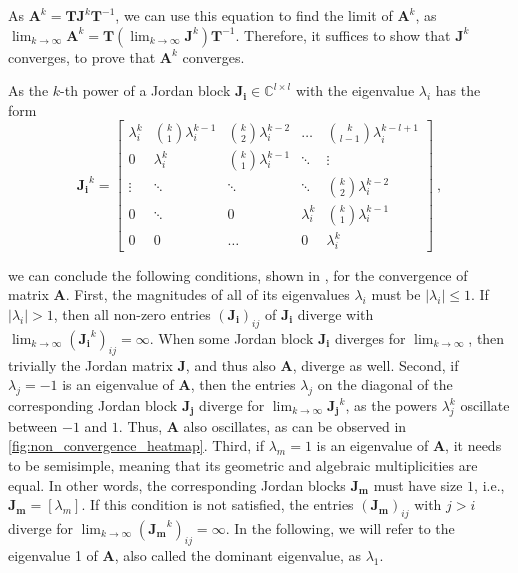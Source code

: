 \documentclass[journal,compsoc,10pt]{IEEEtran}
\newcommand{\CC}{\mathbb{C}}
\renewcommand{\vec}[1]{\bm{#1}}        %
\newcommand{\mat}[1]{\bm{#1}}          %
\begin{document}
As $\mat A^k = \mat T \mat J^k \mat T^{-1}$, %
we can use this equation to find the limit of $\mat A^k$, as $\lim_{k\rightarrow\infty}\mat A^k = \mat T (\lim_{k\rightarrow\infty} \mat J^k) \mat T^{-1}$. Therefore, it suffices to show that $\mat J^k$ converges, to prove that $\mat A^k$ converges.

As the $k$-th power of a Jordan block $\mat{J_i} \in \CC^{l\times l}$ with the eigenvalue $\lambda_i$ has the form 
\[\mat{J_i}^k = \begin{bmatrix}
\lambda_i^k & \binom{k}{1}\lambda_i^{k-1} & \binom{k}{2}\lambda_i^{k-2} & \dots & \binom{k}{l-1}\lambda_i^{k-l+1}\\
0 & \lambda_i^k & \binom{k}{1}\lambda_i^{k-1} & \ddots & \vdots\\
\vdots & \ddots & \ddots & \ddots & \binom{k}{2}\lambda_i^{k-2}\\
0 & \ddots & 0 & \lambda_i^k & \binom{k}{1}\lambda_i^{k-1}\\
0 & 0 & \dots & 0 & \lambda_i^k
\end{bmatrix}\ , \] %

we can conclude the following conditions, shown in \cite{Bullo_lecture}, for the convergence of matrix $\mat A$. First, the magnitudes of all of its eigenvalues $\lambda_i$ must be $|\lambda_i| \leq 1$. If $|\lambda_i| > 1$, then all non-zero entries $(\mat{J_i})_{ij}$ of $\mat{J_i}$ diverge with $\lim_{k\rightarrow\infty}(\mat{J_i}^k)_{ij} = \infty$. When some Jordan block $\mat{J_i}$ diverges for $\lim_{k\rightarrow\infty}$, then trivially the Jordan matrix $\mat J$, and thus also $\mat A$, diverge as well.
Second, if $\lambda_j = -1$ is an eigenvalue of $\mat A$, then the entries $\lambda_j$ on the diagonal of the corresponding Jordan block $\mat{J_j}$ diverge for $\lim_{k\rightarrow\infty}\mat{J_j}^k$, as the powers $\lambda_j^k$ oscillate between $-1$ and $1$. Thus, $\mat A$ also oscillates, as can be observed in \cref{fig:non_convergence_heatmap}.
Third, if $\lambda_m = 1$ is an eigenvalue of $\mat A$, it needs to be semisimple, meaning that its geometric and algebraic multiplicities are equal. In other words, the corresponding Jordan blocks $\mat{J_m}$ must have size $1$, i.e., $\mat{J_m} = [\lambda_m]$.
If this condition is not satisfied, the entries $(\mat{J_m})_{ij}$ with $j>i$ diverge for $\lim_{k\rightarrow\infty}(\mat{J_m}^k)_{ij} = \infty$. In the following, we will refer to the eigenvalue 1 of $\mat A$, also called the dominant eigenvalue, as $\lambda_1$.
\end{document}
